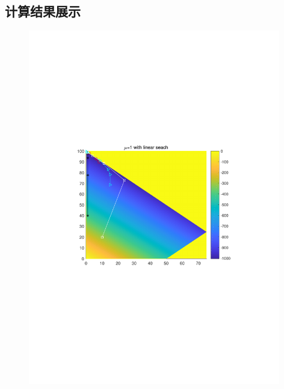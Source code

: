 \subsection{计算结果展示}
\begin{figure}[H]
\centering
\includegraphics[width=11cm]{fig/5_1.pdf}
\end{figure}

